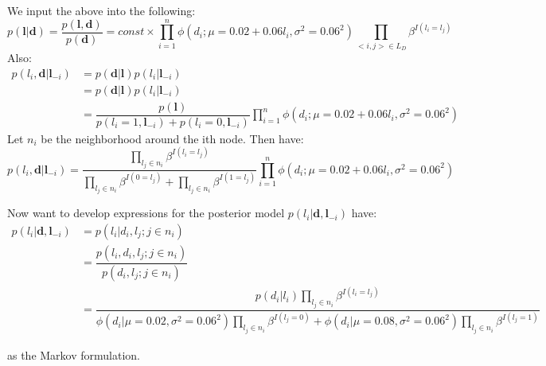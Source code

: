 \documentclass[]{article}
\newcommand{\vect}[1]{\ensuremath{\boldsymbol{\mathbf{#1}}}}
\begin{document}
We input the above into the following: \begin{equation}
    p(\vect l | \vect d) = \dfrac{p(\vect l, \vect d)}{p(\vect d)} = const  \times \prod_{i=1}^{n}  \phi(d_i  ; \mu = 0.02 + 0.06l_i, \sigma^2 = 0.06^2) \prod_{<i, j>\in L_D} \beta^{I(l_i = l_j)}
\end{equation} Also: \begin{equation}
\begin{split}
    p(l_i, \vect d | \vect l_{-i}) &= p(\vect d | \vect l)p(l_i | \vect l_{-i}) \\ &= p(\vect d | \vect l)p(l_i | \vect l_{-i}) \\ 
    &=  \dfrac{p(\vect l)}{p(l_i = 1, \vect l_{-i}) +p(l_i = 0, \vect l_{-i})}  \prod_{i=1}^{n}  \phi(d_i  ; \mu = 0.02 + 0.06l_i, \sigma^2 = 0.06^2) 
\end{split}
\end{equation} Let \(n_i\) be the neighborhood around the ith node. Then
have: \begin{equation}
    p(l_i, \vect d | \vect l_{-i}) = \dfrac{\prod_{l_j \in n_i}\beta^{I(l_i = l_j)}}{\prod_{l_j \in n_i}\beta^{I(0 = l_j)} + \prod_{l_j \in n_i}\beta^{I(1 = l_j)}}     \prod_{i=1}^{n}  \phi(d_i  ; \mu = 0.02 + 0.06l_i, \sigma^2 = 0.06^2) 
\end{equation}

Now want to develop expressions for the posterior model
\(p(l_i | \vect d, \vect l_{-i})\) have: \begin{equation}
    \begin{split}
    p(l_i | \vect d, \vect l_{-i}) &= p(l_i | d_i, l_{j} ; j \in n_i) 
    \\ &= \dfrac{p(l_i, d_i, l_j ; j \in n_i)}{p(d_i, l_j ; j \in n_i)}
    \\ &= \dfrac{p(d_i | l_i)\prod_{l_j \in n_i}\beta^{I(l_i = l_j)}}{\phi(d_i|\mu = 0.02, \sigma^2 = 0.06^2)\prod_{l_j \in n_i}\beta^{I(l_j = 0)} + \phi(d_i|\mu = 0.08, \sigma^2 = 0.06^2)\prod_{l_j \in n_i}\beta^{I(l_j = 1)}} 
    \end{split}     
\end{equation}

as the Markov formulation.
\end{document}
